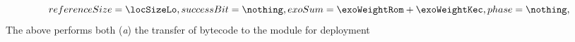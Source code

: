 \begin{description}
\[{				referenceSize     = \locSizeLo                           ,
				successBit        = \nothing                             ,
				exoSum            = \exoWeightRom + \exoWeightKec        ,
				phase             = \nothing                             ,
				}
		\]
		\saNote{}
		The above performs both
		(\emph{a}) the transfer of bytecode to the \romMod{} module for deployment

\end{description}

